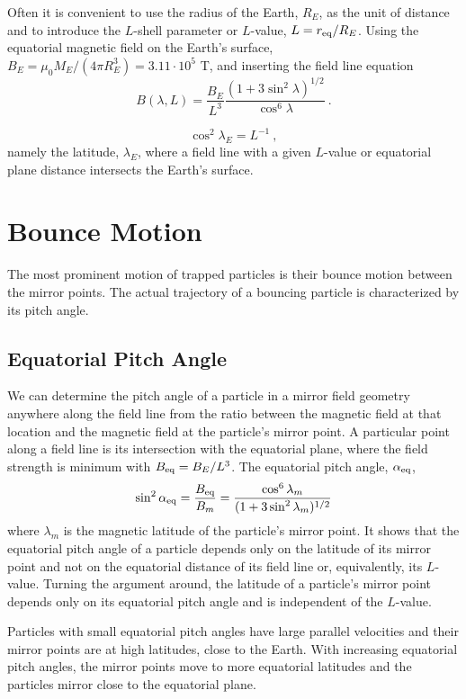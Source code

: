 \documentclass[12pt,a4paper]{article}
\begin{document}
Often it is convenient to use the radius of the Earth, $R_E$, as the unit of distance and to introduce the $L$-shell parameter or $L$-value, $L = r_{\rm eq}/R_E$. Using the equatorial magnetic field on the Earth's surface, $B_E = \mu_0 M_E/(4\pi R^3_E) = 3.11\cdot 10^5$ T, and inserting the field line equation
\begin{equation}
B(\lambda, L) = \dfrac{B_E}{L^3} \dfrac{(1+3\sin^2 \lambda)^{1/2}}{\cos^6 \lambda} ~.
\end{equation}


\begin{equation}
\cos^2 \lambda_E = L^{-1} ~,
\end{equation}
namely the latitude, $\lambda_E$, where a field line with a given $L$-value or equatorial plane distance intersects the Earth's surface.

\section{Bounce Motion}
The most prominent motion of trapped particles is their bounce motion between the mirror points. The actual trajectory of a bouncing particle is characterized by its pitch angle.

\subsection{Equatorial Pitch Angle}
We can determine the pitch angle of a particle in a mirror field geometry anywhere along the field line from the ratio between the magnetic field at that location and the magnetic field at the particle’s mirror point. A particular point along a field line is its intersection with the equatorial plane, where the field strength is minimum with $B_{\rm eq} = B_E/L^3$. The equatorial pitch angle, $\alpha_{\rm eq}$, 
\begin{equation}
\sin^2 \alpha_{\rm eq} = \dfrac{B_{\rm eq}}{B_m} = \dfrac{\cos^6 \lambda_m}{(1+3\sin^2 \lambda_m)^{1/2}}
\end{equation}
where $\lambda_m$ is the magnetic latitude of the particle's mirror point. It shows that the equatorial pitch angle of a particle depends only on the latitude of its mirror point and not on the equatorial distance of its field line or, equivalently, its $L$-value. Turning the argument around, the latitude of a particle’s mirror point depends only on its equatorial pitch angle and is independent of the $L$-value.

Particles with small equatorial pitch angles have large parallel velocities and their mirror points are at high latitudes, close to the Earth. With increasing equatorial pitch angles, the mirror points move to more equatorial latitudes and the particles mirror close to the equatorial plane.
\end{document}
